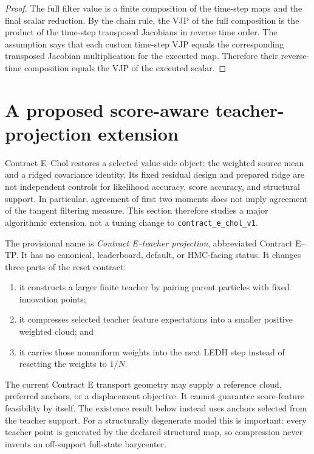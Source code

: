 \begin{proof}
The full filter value is a finite composition of the time-step maps and the
final scalar reduction.  By the chain rule, the VJP of the full composition is
the product of the time-step transposed Jacobians in reverse time order.  The
assumption says that each custom time-step VJP equals the corresponding
transposed Jacobian multiplication for the executed map.  Therefore their
reverse-time composition equals the VJP of the executed scalar.
\end{proof}

\section{A proposed score-aware teacher-projection extension}
\label{sec:bf-ledh-contract-e-score-aware-teacher-projection}

Contract E--Chol restores a selected value-side object: the weighted source
mean and a ridged covariance identity.  Its fixed residual design and prepared
ridge are not independent controls for likelihood accuracy, score accuracy,
and structural support.  In particular, agreement of first two moments does not
imply agreement of the tangent filtering measure.  This section therefore
studies a major algorithmic extension, not a tuning change to
\texttt{contract\_e\_chol\_v1}.

The provisional name is \emph{Contract E--teacher projection}, abbreviated
Contract E--TP.  It has no canonical, leaderboard, default, or HMC-facing status.
It changes three parts of the reset contract:
\begin{enumerate}[label=(\arabic*)]
  \item it constructs a larger finite teacher by pairing parent particles with
    fixed innovation points;
  \item it compresses selected teacher feature expectations into a smaller
    positive weighted cloud; and
  \item it carries those nonuniform weights into the next LEDH step instead of
    resetting the weights to \(1/N\).
\end{enumerate}
The current Contract E transport geometry may supply a reference cloud,
preferred anchors, or a displacement objective.  It cannot guarantee
score-feature feasibility by itself.  The existence result below instead uses
anchors selected from the teacher support.  For a structurally degenerate model
this is important: every teacher point is generated by the declared structural
map, so compression never invents an off-support full-state barycenter.

